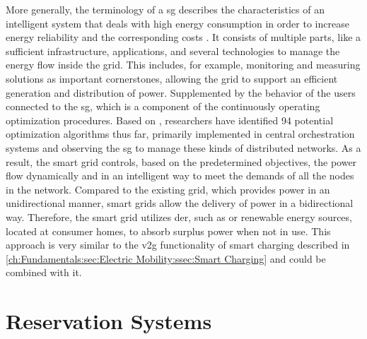 More generally, the terminology of a \acrfull{sg} describes the characteristics of an intelligent system that deals with high energy consumption in order to increase energy reliability and the corresponding costs \cite{sharma_smart_2020,moreno_escobar_comprehensive_2021}.
It consists of multiple parts, like a sufficient infrastructure, applications, and several technologies to manage the energy flow inside the grid.
This includes, for example, monitoring and measuring solutions as important cornerstones, allowing the grid to support an efficient generation and distribution of power. Supplemented by the behavior of the users connected to the \acrshort{sg}, which is a component of the continuously operating optimization procedures.
Based on \cite{moreno_escobar_comprehensive_2021}, researchers have identified 94 potential optimization algorithms thus far, primarily implemented in central orchestration systems and observing the \acrshort{sg} to manage these kinds of distributed networks.
As a result, the smart grid controls, based on the predetermined objectives, the power flow dynamically and in an intelligent way to meet the demands of all the nodes in the network. Compared to the existing grid, which provides power in an unidirectional manner, smart grids allow the delivery of power in a bidirectional way. 
Therefore, the smart grid utilizes \acrshort{der}, such as  or renewable energy sources, located at consumer homes, to absorb surplus power when not in use.
This approach is very similar to the \acrshort{v2g} functionality of smart charging described in \ref{ch:Fundamentals:sec:Electric Mobility:ssec:Smart Charging} and could be combined with it.

\section{Reservation Systems}
\label{ch:Fundamentals:sec:Reservation Systems}

